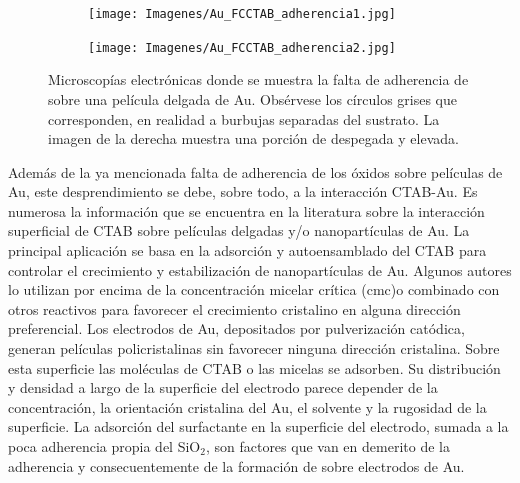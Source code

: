 	     
				\begin{figure}[th]
		 	   	    \begin{subfigure}[t]{0.49\textwidth}
			        	\texttt{[image: Imagenes/Au\_FCCTAB\_adherencia1.jpg]}
			       		\end{subfigure}
					\begin{subfigure}[t]{0.49\textwidth}
			 	   	    \texttt{[image: Imagenes/Au\_FCCTAB\_adherencia2.jpg]}
			       		\end{subfigure}
					 \caption[Adherencia de CTAB sobre electrodos.]{Microscopías electrónicas donde se muestra la falta de adherencia de \pdmC\space sobre una película delgada de Au. Obsérvese los círculos grises que corresponden, en realidad a burbujas separadas del sustrato. La imagen de la derecha muestra una porción de \pdmC\space despegada y elevada.}
					 \label{fig:CTAB_adherencia}	
				     \end{figure}
			
			Además de la ya mencionada falta de adherencia de los óxidos sobre películas de Au, este desprendimiento se debe, sobre todo, a la interacción CTAB-Au. Es numerosa la información que se encuentra en la literatura sobre la interacción superficial de CTAB sobre películas delgadas y/o nanopartículas de Au. La principal aplicación se basa en la adsorción y autoensamblado del CTAB para controlar el crecimiento y estabilización de nanopartículas de Au. \cite{Cheng2003,Smith2008,Meena2013,Wang2013,Hamon2009} Algunos autores lo utilizan por encima de la concentración micelar crítica (cmc)\cite{Lim2014}o combinado con otros reactivos para favorecer el crecimiento cristalino en alguna dirección preferencial\cite{Smith2009}. Los electrodos de Au, depositados por pulverización catódica, generan películas policristalinas sin favorecer ninguna dirección cristalina.\cite{Svorcik2010,Bechelany2010} Sobre esta superficie las moléculas de CTAB o las micelas se adsorben. Su distribución y densidad a largo de la superficie del electrodo parece depender de la concentración, la orientación cristalina del Au, el solvente y la rugosidad de la superficie\cite{Meena2013,Lim2014}. La adsorción del surfactante en la superficie del electrodo, sumada a la poca adherencia propia del SiO$_2$, son factores que van en demerito de la adherencia y consecuentemente de la formación de \pdmC\space sobre electrodos de Au.
							
